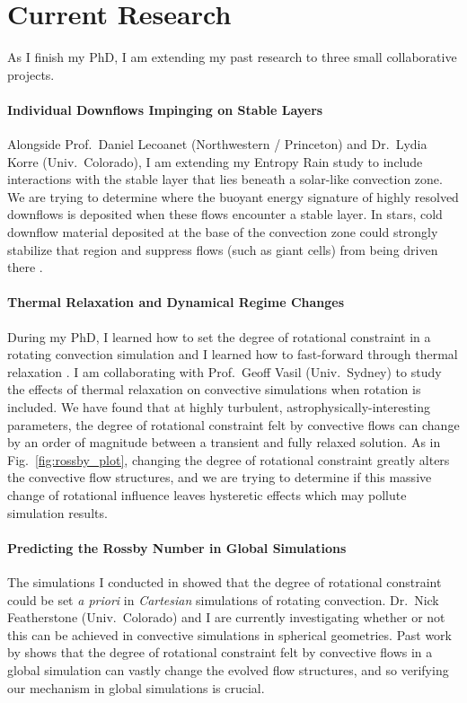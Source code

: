 \documentclass[preprint, hmargin=1in, vmargin=1in]{aastex62}
\begin{document}
\vspace{-44pt}
\section*{\textbf{Current Research}}
As I finish my PhD, I am extending my past research to three small collaborative projects.

\vspace{-4pt}
\paragraph{Individual Downflows Impinging on Stable Layers}
Alongside Prof.~Daniel Lecoanet (Northwestern / Princeton) and Dr.~Lydia Korre (Univ.~Colorado), I am extending my Entropy Rain study to include interactions with the stable layer that lies beneath a solar-like convection zone.
We are trying to determine where the buoyant energy signature of highly resolved downflows is deposited when these flows encounter a stable layer.
In stars, cold downflow material deposited at the base of the convection zone could strongly stabilize that region and suppress flows (such as giant cells) from being driven there \citep{cossette&rast2016}.

\vspace{-4pt}
\paragraph{Thermal Relaxation and Dynamical Regime Changes}
During my PhD, I learned how to set the degree of rotational constraint in a rotating convection simulation \citep{anders&all2019} and I learned how to fast-forward through thermal relaxation \citep{anders&all2018}.
I am collaborating with Prof.~Geoff Vasil (Univ.~Sydney) to study the effects of thermal relaxation on convective simulations when rotation is included.
We have found that at highly turbulent, astrophysically-interesting parameters, the degree of rotational constraint felt by convective flows can change by an order of magnitude between a transient and fully relaxed solution.
As in Fig.~\ref{fig:rossby_plot}, changing the degree of rotational constraint greatly alters the convective flow structures, and we are trying to determine if this massive change of rotational influence leaves hysteretic effects which may pollute simulation results.

\vspace{-4pt}
\paragraph{Predicting the Rossby Number in Global Simulations}
The simulations I conducted in \citet{anders&all2019} showed that the degree of rotational constraint could be set \emph{a priori} in \emph{Cartesian} simulations of rotating convection.
Dr.~Nick Featherstone (Univ.~Colorado) and I are currently investigating whether or not this can be achieved in convective simulations in spherical geometries.
Past work by \citet{featherstone&hindman2016} shows that the degree of rotational constraint felt by convective flows in a global simulation can vastly change the evolved flow structures, and so verifying our mechanism in global simulations is crucial.




\end{document}
